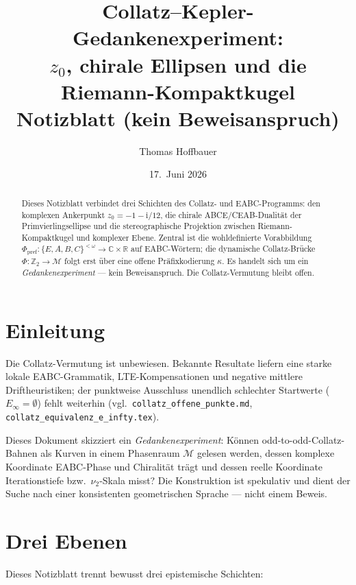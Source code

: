 \documentclass[11pt,a4paper]{article}
\title{Collatz--Kepler-Gedankenexperiment:\\
  $z_0$, chirale Ellipsen und die Riemann-Kompaktkugel\\
  \large Notizblatt (kein Beweisanspruch)}
\author{Thomas Hoffbauer}
\date{17.\ Juni 2026}
\theoremstyle{definition}
\theoremstyle{remark}
\newcommand{\R}{\mathbb{R}}
\newcommand{\C}{\mathbb{C}}
\newcommand{\Einf}{E_{\infty}}
\newcommand{\vii}{\nu_2}
\begin{document}
\maketitle

\begin{abstract}
Dieses Notizblatt verbindet drei Schichten des Collatz- und EABC-Programms:
den komplexen Ankerpunkt $z_0=-1-\mathrm{i}/12$, die chirale
ABCE/CEAB-Dualität der Primvierlingsellipse und die stereographische
Projektion zwischen Riemann-Kompaktkugel und komplexer Ebene.
Zentral ist die wohldefinierte Vorabbildung
$\Phi_{\mathrm{pref}}:\{E,A,B,C\}^{<\omega}\to\C\times\R$ auf
EABC-Wörtern; die dynamische Collatz-Brücke $\Phi:\mathbb{Z}_2\to\mathcal{M}$
folgt erst über eine offene Präfixkodierung $\kappa$.
Es handelt sich um ein \emph{Gedankenexperiment} --- kein Beweisanspruch.
Die Collatz-Vermutung bleibt offen.
\end{abstract}

\section{Einleitung}

Die Collatz-Vermutung ist unbewiesen. Bekannte Resultate liefern eine
starke lokale EABC-Grammatik, LTE-Kompensationen und negative
mittlere Driftheuristiken; der punktweise Ausschluss unendlich
schlechter Startwerte ($\Einf=\emptyset$) fehlt weiterhin
(vgl.\ \texttt{collatz\_offene\_punkte.md},
\texttt{collatz\_equivalenz\_e\_infty.tex}).

Dieses Dokument skizziert ein \emph{Gedankenexperiment}: Können
odd-to-odd-Collatz-Bahnen als Kurven in einem Phasenraum
$\mathcal{M}$ gelesen werden, dessen komplexe Koordinate EABC-Phase
und Chiralität trägt und dessen reelle Koordinate Iterationstiefe
bzw.\ $\vii$-Skala misst? Die Konstruktion ist spekulativ und dient
der Suche nach einer konsistenten geometrischen Sprache --- nicht
einem Beweis.

\section{Drei Ebenen}

Dieses Notizblatt trennt bewusst drei epistemische Schichten:
\end{document}
